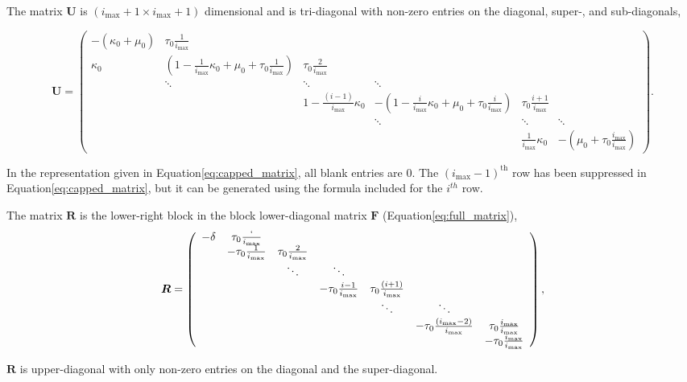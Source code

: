 \documentclass[a4,center,fleqn,nocrop]{NAR}
\newcommand{\imax}{\ensuremath{{i_{\max}}}\xspace}
\let\bs\boldsymbol
\begin{document}
The matrix $\bs{U}$ is $(\imax+1\times \imax+1)$ dimensional and is tri-diagonal with non-zero entries on the diagonal, super-, and sub-diagonals,
\pagebreak
\begin{strip}
\begin{equation}
\bs{U}=\left(\begin{array}{cccccc}
-(\kappa_0+\mu_0) & \tau_0\frac{1}{\imax} &  &  &  & \\
\kappa_0 & \left(1-\frac{1}{\imax} \kappa_0+\mu_0+\tau_0\frac{1}{\imax}\right) & \tau_0\frac{2}{\imax} &  &  & \\
   &\ddots        & \ddots        & \ddots & &  \\
   & &    1-\frac{(i-1)}{\imax}\kappa_0 & -\left(1-\frac{i}{\imax}\kappa_0+\mu_0+\tau_0\frac{i}{\imax}\right) & \tau_0\frac{i+1}{\imax} & \\
                  &         &        & \ddots  & \ddots & \ddots \\
     
                          &        &  &  & \frac{1}{\imax}\kappa_0 & -\left(\mu_0+\tau_0\frac{\imax}{\imax}\right)
\end{array}\right).
\end{equation}

In the representation given in Equation\ref{eq:capped_matrix}, all blank entries are 0.
The $(\imax-1)^{\text{th}}$ row has been suppressed in Equation\ref{eq:capped_matrix}, but it can be generated using the formula included for the $i^{th}$ row.

The matrix $\bs{R}$ is the lower-right block in the block lower-diagonal matrix $\bs{F}$ (Equation\ref{eq:full_matrix}),
\begin{equation}
\bs{R}=\left(
\begin{array}{ccccccc}
-\delta & \tau_0\frac{`}{\imax} & & & & & \\
 & -\tau_0\frac{1}{\imax} & \tau_0\frac{2}{\imax} & & & &\\
 & & \ddots & \ddots & & & \\
 & & & -\tau_0\frac{i-1}{\imax} & \tau_0\frac{(i+1)}{\imax} & & \\
 & & & & \ddots & \ddots & \\
 & & & & & -\tau_0\frac{(\imax-2)}{\imax} & \tau_0\frac{\imax}{\imax} \\
 & & & & & & -\tau_0\frac{\imax}{\imax}
\end{array}
\right),
\end{equation}
\end{strip}
$\bs{R}$ is upper-diagonal with only non-zero entries on the diagonal and the super-diagonal.
\end{document}
